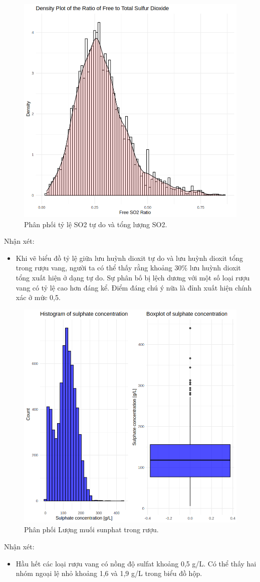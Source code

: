 \begin{figure}[H]
    \centering
    \includegraphics[width=0.75\columnwidth]{wine_colors/wine_ratio_sulfur.png}
    \caption{Phân phối tỷ lệ SO2 tự do và tổng lượng SO2.}
    \label{fig:wine_ratio_sulfur}
\end{figure}
Nhận xét:
\begin{itemize}
    \item Khi vẽ biểu đồ tỷ lệ giữa lưu huỳnh dioxit tự do và lưu huỳnh dioxit tổng trong rượu vang, người ta có thể thấy rằng khoảng 30\% lưu huỳnh dioxit tổng xuất hiện ở dạng tự do. Sự phân bố bị lệch dương với một số loại rượu vang có tỷ lệ cao hơn đáng kể. Điểm đáng chú ý nữa là đỉnh xuất hiện chính xác ở mức 0,5.
\end{itemize}

\begin{figure}[H]
    \centering
    \includegraphics[width=0.75\columnwidth]{wine_colors/wine_sulphate.png}
    \caption{Phân phối Lượng muối sunphat trong rượu.}
    \label{fig:wine_sulphate}
\end{figure}
Nhận xét:
\begin{itemize}
    \item Hầu hết các loại rượu vang có nồng độ sulfat khoảng 0,5 g/L. Có thể thấy hai nhóm ngoại lệ nhỏ khoảng 1,6 và 1,9 g/L trong biểu đồ hộp.
\end{itemize}

